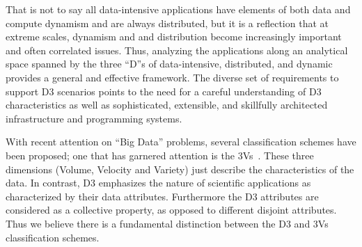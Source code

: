 That is not to say all data-intensive applications have elements of
both data and compute dynamism and are always distributed, but it is a
reflection that at extreme scales, dynamism and and distribution
become increasingly important and often correlated issues.  Thus,
analyzing the applications along an analytical space spanned by the
three ``D''s of data-intensive, distributed, and dynamic provides a
general and effective framework.  The diverse set of requirements to
support D3 scenarios points to the need for a careful understanding of
D3 characteristics as well as sophisticated, extensible, and
skillfully architected infrastructure and programming systems.

With recent attention on ``Big Data'' problems, several classification
schemes have been proposed; one that has garnered attention is the
3Vs~\cite{gartner3v}. These three
dimensions (Volume, Velocity and Variety) just describe the
characteristics of the data. %
  In contrast,  D3 
emphasizes the nature of scientific applications as characterized
by their data attributes. Furthermore the D3 attributes are considered
as a collective property, as opposed to  different disjoint attributes.
Thus we believe there is a fundamental distinction between the D3 and
3Vs classification schemes.

  
